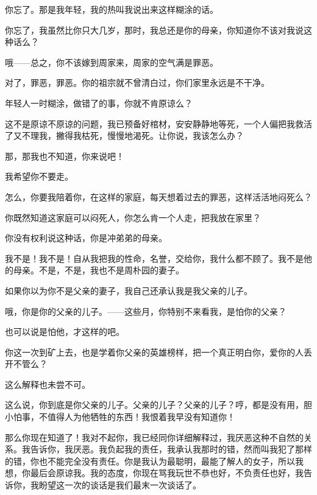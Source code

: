你忘了。那是我年轻，我的热叫我说出来这样糊涂的话。

你忘了，我虽然比你只大几岁，那时，我总还是你的母亲，你知道你不该对我说这种话么？

哦——总之，你不该嫁到周家来，周家的空气满是罪恶。

对了，罪恶，罪恶。你的祖宗就不曾清白过，你们家里永远是不干净。

年轻人一时糊涂，做错了的事，你就不肯原谅么？

这不是原谅不原谅的问题，我已预备好棺材，安安静静地等死，一个人偏把我救活了又不理我，撇得我枯死，慢慢地渴死。让你说，我该怎么办？

那，那我也不知道，你来说吧！

我希望你不要走。

怎么，你要我陪着你，在这样的家庭，每天想着过去的罪恶，这样活活地闷死么？

你既然知道这家庭可以闷死人，你怎么肯一个人走，把我放在家里？

你没有权利说这种话，你是冲弟弟的母亲。

我不是！我不是！自从我把我的性命，名誉，交给你，我什么都不顾了。我不是他的母亲。不是，不是，我也不是周朴园的妻子。

如果你以为你不是父亲的妻子，我自己还承认我是我父亲的儿子。

哦，你是你的父亲的儿子。——这些月，你特别不来看我，是怕你的父亲？

也可以说是怕他，才这样的吧。

你这一次到矿上去，也是学着你父亲的英雄榜样，把一个真正明白你，爱你的人丢开不管么？

这么解释也未尝不可。

这么说，你到底是你父亲的儿子。父亲的儿子？父亲的儿子？哼，都是没有用，胆小怕事，不值得人为他牺牲的东西！我恨着我早没有知道你！

那么你现在知道了！我对不起你，我已经同你详细解释过，我厌恶这种不自然的关系。我告诉你，我厌恶。我负起我的责任，我承认我那时的错，然而叫我犯了那样的错，你也不能完全没有责任。你是我认为最聪明，最能了解人的女子，所以我想，你最后会原谅我。我的态度，你现在骂我玩世不恭也好，不负责任也好，我告诉你，我盼望这一次的谈话是我们最末一次谈话了。

